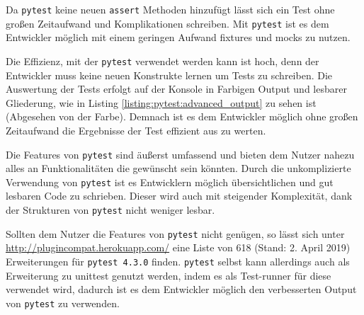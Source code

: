 Da \lstinline{pytest} keine neuen \lstinline{assert} Methoden hinzufügt lässt
sich ein Test ohne großen Zeitaufwand und Komplikationen schreiben. Mit
\lstinline{pytest} ist es dem Entwickler möglich mit einem geringen Aufwand
\Glspl{fixture} und \Glspl{mock} zu nutzen.

Die Effizienz, mit der \lstinline{pytest} verwendet werden kann ist hoch, denn
der Entwickler muss keine neuen Konstrukte lernen um Tests zu schreiben. Die
Auswertung der Tests erfolgt auf der Konsole in Farbigen Output und lesbarer
Gliederung, wie in Listing \ref{listing:pytest:advanced_output} zu sehen ist
(Abgesehen von der Farbe). Demnach ist es dem Entwickler möglich ohne großen
Zeitaufwand die Ergebnisse der Test effizient aus zu werten.

Die Features von \lstinline{pytest} sind äußerst umfassend und bieten dem Nutzer
nahezu alles an Funktionalitäten die gewünscht sein könnten. Durch die
unkomplizierte Verwendung von \lstinline{pytest} ist es Entwicklern möglich
übersichtlichen und gut lesbaren Code zu schrieben. Dieser wird auch mit
steigender Komplexität, dank der Strukturen von \lstinline{pytest} nicht weniger
lesbar.

Sollten dem Nutzer die Features von \lstinline{pytest} nicht genügen, so lässt
sich unter \url{http://plugincompat.herokuapp.com/} eine Liste von 618
(Stand: 2. April 2019) Erweiterungen für \lstinline{pytest 4.3.0} finden.
\lstinline{pytest} selbst kann allerdings auch als Erweiterung zu unittest
genutzt werden, indem es als Test-runner für diese verwendet wird, dadurch ist
es dem Entwickler möglich den verbesserten Output von \lstinline{pytest} zu
verwenden.